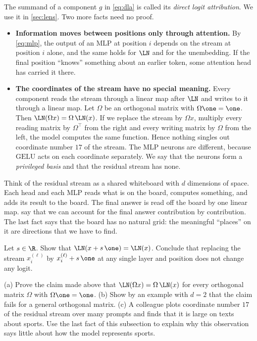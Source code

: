 The summand of a component $g$ in \eqref{eq:dla} is called its \emph{direct logit attribution}. We use it in
\cref{sec:lens}. Two more facts need no proof.

\begin{itemize}
\item \textbf{Information moves between positions only through attention.} By \eqref{eq:mlp}, the output of an
MLP at position $i$ depends on the stream at position $i$ alone, and the same holds for $\LN$ and for the
unembedding. If the final position ``knows'' something about an earlier token, some attention head has carried
it there.
\item \textbf{The coordinates of the stream have no special meaning.} Every component reads the stream through
a linear map after $\LN$ and writes to it through a linear map. Let $\Omega$ be an orthogonal matrix with $\Omega\one=\one$.
Then $\LN(\Omega x)=\Omega\,\LN(x)$. If we replace the stream by $\Omega x$, multiply every reading matrix by
$\Omega^\top$ from the right and every writing matrix by $\Omega$ from the left, the model computes the same
function. Hence nothing singles out coordinate number
$17$ of the stream. The MLP neurons are different, because $\mathrm{GELU}$ acts on each coordinate separately.
We say that the neurons form a \emph{privileged basis} and that the residual stream has none.
\end{itemize}

\begin{intuition}
Think of the residual stream as a shared whiteboard with $d$ dimensions of space. Each head and each MLP reads
what is on the board, computes something, and adds its result to the board. The final answer is read off the
board by one linear map.  say that we can account for the final answer contribution by
contribution. The last fact says that the board has no natural grid: the meaningful ``places'' on it are
directions that we have to find.
\end{intuition}

\begin{exercise}\label{ex:ones}
Let $s\in\R$. Show that $\LN(x+s\,\one)=\LN(x)$. Conclude that replacing the stream $x_i^{(\ell)}$ by
$x_i^{(\ell)}+s\,\one$ at any single layer and position does not change any logit.
\end{exercise}

\begin{exercise}\label{ex:rotation}
(a) Prove the claim made above that $\LN(\Omega x)=\Omega\,\LN(x)$ for every orthogonal matrix $\Omega$ with
$\Omega\one=\one$. (b) Show by an example with $d=2$ that the claim fails for a general orthogonal matrix.
(c) A colleague plots coordinate number $17$ of the residual stream over many prompts and finds that it is large
on texts about sports. Use the last fact of this subsection to explain why this observation says little about
how the model represents sports.
\end{exercise}

